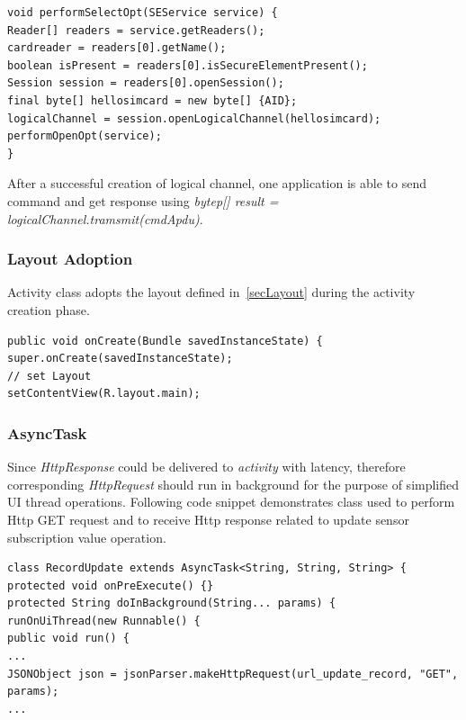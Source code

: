 \begin{Verbatim}[fontsize=\relsize{-1},frame=lines,framesep=4mm, label=\fbox{\small\emph{Service and logical channel Creation}}]
void performSelectOpt(SEService service) {
Reader[] readers = service.getReaders();
cardreader = readers[0].getName();
boolean isPresent = readers[0].isSecureElementPresent();
Session session = readers[0].openSession();
final byte[] hellosimcard = new byte[] {AID};
logicalChannel = session.openLogicalChannel(hellosimcard);
performOpenOpt(service);
}
\end{Verbatim}
After a successful creation of logical channel, one application is able to send command and get response using \emph{bytep[] result = logicalChannel.tramsmit(cmdApdu)}.
\subsubsection{Layout Adoption}
Activity class adopts the layout defined in~\ref{secLayout} during the activity creation phase.

\begin{Verbatim}[fontsize=\relsize{-1},frame=lines,framesep=4mm, label=\fbox{\small\emph{Layout Adoption}}]
public void onCreate(Bundle savedInstanceState) {
super.onCreate(savedInstanceState);
// set Layout
setContentView(R.layout.main);
\end{Verbatim}

\subsubsection{AsyncTask}
Since \emph{HttpResponse} could be delivered to \emph{activity} with latency, therefore corresponding \emph{HttpRequest} should run in background for the purpose of simplified UI thread operations. Following code snippet demonstrates class used to perform Http GET request and to receive Http response related to update sensor subscription value operation.
\begin{Verbatim}[fontsize=\relsize{-1},frame=lines,framesep=4mm, label=\fbox{\small\emph{AsyncTask HttpRequest}}]
class RecordUpdate extends AsyncTask<String, String, String> {
protected void onPreExecute() {}	
protected String doInBackground(String... params) {
runOnUiThread(new Runnable() {
public void run() {
...
JSONObject json = jsonParser.makeHttpRequest(url_update_record, "GET", params);
...
\end{Verbatim}

